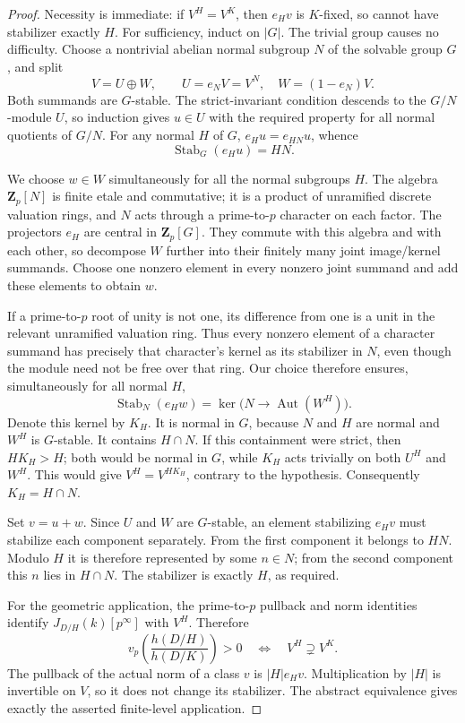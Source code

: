\documentclass[11pt]{article}
\begin{document}
\begin{proof}
Necessity is immediate: if \(V^H=V^K\), then \(e_Hv\)
is \(K\)-fixed, so cannot have stabilizer exactly \(H\).
For sufficiency, induct on \(|G|\). The trivial group
causes no difficulty. Choose a nontrivial abelian normal
subgroup \(N\) of the solvable group \(G\), and split
\[
                  V=U\oplus W,\qquad
                  U=e_NV=V^N,\quad W=(1-e_N)V.
\]
Both summands are \(G\)-stable. The strict-invariant
condition descends to the \(G/N\)-module \(U\), so induction
gives \(u\in U\) with the required property for all normal
quotients of \(G/N\). For any normal \(H\) of \(G\),
\(e_Hu=e_{HN}u\), whence
\[
                     \operatorname{Stab}_G(e_Hu)=HN.
\]

We choose \(w\in W\) simultaneously for all the normal
subgroups \(H\). The algebra \(\mathbf Z_p[N]\) is finite
etale and commutative; it is a product of unramified
discrete valuation rings, and \(N\) acts through a
prime-to-\(p\) character on each factor. The projectors
\(e_H\) are central in \(\mathbf Z_p[G]\). They commute
with this algebra and with each other, so decompose
\(W\) further into their finitely many joint image/kernel
summands. Choose one nonzero element in every nonzero
joint summand and add these elements to obtain \(w\).

If a prime-to-\(p\) root of unity is not one, its
difference from one is a unit in the relevant
unramified valuation ring. Thus every nonzero element
of a character summand has precisely that character's
kernel as its stabilizer in \(N\), even though the
module need not be free over that ring. Our choice
therefore ensures, simultaneously for all normal \(H\),
\[
 \operatorname{Stab}_N(e_Hw)
       =\ker\bigl(N\longrightarrow
                         \operatorname{Aut}(W^H)\bigr).
\]
Denote this kernel by \(K_H\). It is normal in \(G\),
because \(N\) and \(H\) are normal and \(W^H\) is
\(G\)-stable. It contains \(H\cap N\). If this
containment were strict, then \(HK_H>H\); both would
be normal in \(G\), while \(K_H\) acts trivially on
both \(U^H\) and \(W^H\). This would give
\(V^H=V^{HK_H}\), contrary to the hypothesis.
Consequently \(K_H=H\cap N\).

Set \(v=u+w\). Since \(U\) and \(W\) are \(G\)-stable,
an element stabilizing \(e_Hv\) must stabilize each
component separately. From the first component it
belongs to \(HN\). Modulo \(H\) it is therefore
represented by some \(n\in N\); from the second
component this \(n\) lies in \(H\cap N\).
The stabilizer is exactly \(H\), as required.

For the geometric application, the prime-to-\(p\)
pullback and norm identities identify
\(J_{D/H}(k)[p^\infty]\) with \(V^H\). Therefore
\[
 v_p\!\left(\frac{h(D/H)}{h(D/K)}\right)>0
                  \quad\Longleftrightarrow\quad
                  V^H\supsetneq V^K.
\]
The pullback of the actual norm of a class \(v\)
is \(|H|e_Hv\). Multiplication by \(|H|\) is
invertible on \(V\), so it does not change its
stabilizer. The abstract equivalence gives exactly
the asserted finite-level application.
\end{proof}
\end{document}
